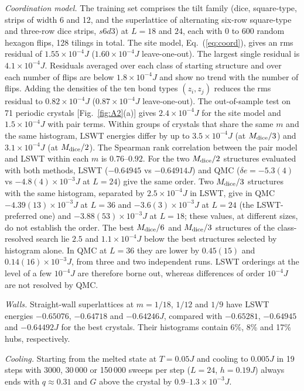 \documentclass[prb,twocolumn,amsmath,amssymb,floatfix]{revtex4-2}
\newcommand{\Md}{M_{\rm dice}}
\begin{document}
\emph{Coordination model.} The training set comprises the tilt family (dice, square-type, strips of width 6 and 12, and the superlattice of alternating six-row square-type and three-row dice strips, $s6d3$) at $L=18$ and $24$, each with 0 to 600 random hexagon flips, 128 tilings in total. The site model, Eq.~(\ref{eq:coord}), gives an rms residual of $1.55\times10^{-4}J$ ($1.60\times10^{-4}J$ leave-one-out). The largest single residual is $4.1\times10^{-4}J$. Residuals averaged over each class of starting structure and over each number of flips are below $1.8\times10^{-4}J$ and show no trend with the number of flips. Adding the densities of the ten bond types $(z_i,z_j)$ reduces the rms residual to $0.82\times10^{-4}J$ ($0.87\times10^{-4}J$ leave-one-out). The out-of-sample test on 71 periodic crystals [Fig.~\ref{fig:A2}(a)] gives $2.4\times10^{-4}J$ for the site model and $1.5\times10^{-4}J$ with pair terms. Within groups of crystals that share the same $m$ and the same histogram, LSWT energies differ by up to $3.5\times10^{-4}J$ (at $\Md/3$) and $3.1\times10^{-4}J$ (at $\Md/2$). The Spearman rank correlation between the pair model and LSWT within each $m$ is $0.76$--$0.92$. For the two $\Md/2$ structures evaluated with both methods, LSWT ($-0.64945$ vs $-0.64914J$) and QMC ($\delta e=-5.3(4)$ vs $-4.8(4)\times10^{-3}J$ at $L=24$) give the same order. Two $\Md/3$ structures with the same histogram, separated by $2.5\times10^{-4}J$ in LSWT, give in QMC $-4.39(13)\times10^{-3}J$ at $L=36$ and $-3.6(3)\times10^{-3}J$ at $L=24$ (the LSWT-preferred one) and $-3.88(53)\times10^{-3}J$ at $L=18$; these values, at different sizes, do not establish the order. The best $\Md/6$ and $\Md/3$ structures of the class-resolved search lie $2.5$ and $1.1\times10^{-4}J$ below the best structures selected by histogram alone. In QMC at $L=36$ they are lower by $0.45(15)$ and $0.14(16)\times10^{-3}J$, from three and two independent runs. LSWT orderings at the level of a few $10^{-4}J$ are therefore borne out, whereas differences of order $10^{-4}J$ are not resolved by QMC.

\emph{Walls.} Straight-wall superlattices at $m=1/18$, $1/12$ and $1/9$ have LSWT energies $-0.65076$, $-0.64718$ and $-0.64246J$, compared with $-0.65281$, $-0.64945$ and $-0.64492J$ for the best crystals. Their histograms contain 6\%, 8\% and 17\% hubs, respectively.

\emph{Cooling.} Starting from the melted state at $T=0.05J$ and cooling to $0.005J$ in 19 steps with 3000, 30\,000 or 150\,000 sweeps per step ($L=24$, $h=0.19J$) always ends with $q\approx0.31$ and $G$ above the crystal by $0.9$--$1.3\times10^{-3}J$.
\end{document}
